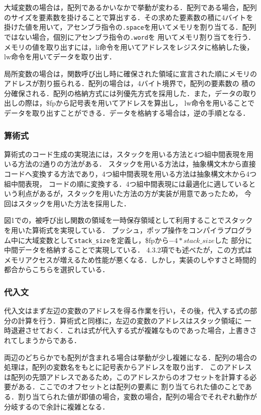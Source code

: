 \documentclass[a4paper,11pt]{jarticle}
\begin{document}
{大域変数の場合は，配列であるかいなかで挙動が変わる．配列である場合，配列のサイズを要素数を掛けることで算出する．その求めた要素数の積に4バイトを
掛けた値を用いて，アセンブラ指令の\verb|.space|を用いてメモリを割り当てる．配列ではない場合，個別にアセンブラ指令の\verb|.word|を
用いてメモリ割り当てを行う．メモリの値を取り出すには，li命令を用いてアドレスをレジスタに格納した後，lw命令を用いてデータを取り出す．

局所変数の場合は，関数呼び出し時に確保された領域に宣言された順にメモリのアドレスが割り振られる．配列の場合は，4バイト境界で，配列の要素数の
積の分確保される．配列の格納方式には列優先方式を採用した．また，データの取り出しの際は，\$fpから記号表を用いてアドレスを算出し，
lw命令を用いることでデータを取り出すことができる．データを格納する場合は，逆の手順となる．

\subsubsection{算術式}
算術式のコード生成の実現法には，スタックを用いる方法と4つ組中間表現を用いる方法の2通りの方法がある．
スタックを用いる方法は，抽象構文木から直接コードへ変換する方法であり，4つ組中間表現を用いる方法は抽象構文木から4つ組中間表現，
コードの順に変換する．4つ組中間表現には最適化に適しているという利点があるが，スタックを用いた方法の方が実装が用意であったため，
今回はスタックを用いた方法を採用した．

図1での，被呼び出し関数の領域を一時保存領域として利用することでスタックを用いた算術式を実現している．
プッシュ，ポップ操作をコンパイラプログラム中に大域変数として\verb|stack_size|を定義し，\$fpから$-4*stack\_size$した
部分に中間データを格納することで実現している．
4.3.2項でも述べたが，この方式はメモリアクセスが増えるため性能が悪くなる．しかし，実装のしやすさと時間的都合からこちらを選択している．

\subsubsection{代入文}
代入文はまず左辺の変数のアドレスを得る作業を行い，その後，代入する式の部分の計算を行う．算術式と同様に，左辺の変数のアドレスはスタック領域に
一時退避させておく．これは式が代入する式が複雑なものであった場合，上書きされてしまうからである．

両辺のどちらかでも配列が含まれる場合は挙動が少し複雑になる．配列の場合の処理は，配列の変数名をもとに記号表からアドレスを取り出す．
このアドレスは配列の先頭アドレスであるため，このアドレスからのオフセットを計算する必要がある．ここでのオフセットとは配列の要素に
割り当てられた値のことである．割り当てられた値が即値の場合，変数の場合，配列の場合でそれぞれ動作が分岐するので余計に複雑となる．

}
\end{document}
